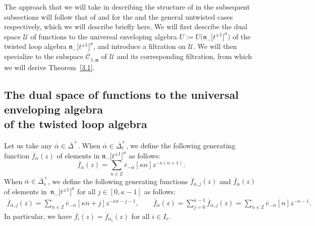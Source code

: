 \documentclass[pdftex]{sigma}
\numberwithin{equation}{section}
\begin{document}
The approach that we will take in describing the structure of  in the subsequent subsections will follow that of \cite{AKS06} and \cite{AK07} for the  and the general untwisted cases respectively, which we will describe briefly here. We will first describe the dual space $\mathcal{U}$ of functions to the universal enveloping algebra $U:=U\bigl(\mathfrak{n}_-\bigl[t^{\pm1}\bigr]^{\sigma}\bigr)$ of the twisted loop algebra $\mathfrak{n}_-\bigl[t^{\pm1}\bigr]^{\sigma}$, and introduce a filtration on $\mathcal{U}$. We will then specialize to the
subspace $\overline{\mathcal{C}}_{\overline{\lambda}, \mathbf{n}}$ of $\mathcal{U}$ and its corresponding filtration, from which we will derive Theorem~\ref{3.1}.

\subsection[The dual space of functions to the universal enveloping algebra of the twisted loop algebra]{The dual space of functions to the universal enveloping algebra\\ of the twisted loop algebra}\label{Section 3.2}

Let us take any $\overline{\alpha}\in\overline{\Delta}^+$. When $\overline{\alpha}\in\overline{\Delta}_{\ell}^+$, we define the following generating function $\overline{f}_{\overline{\alpha}}(z)$ of elements in $\mathfrak{n}_-\bigl[t^{\pm1}\bigr]^{\sigma}$ as follows:
\begin{equation*}
\overline{f}_{\overline{\alpha}}(z)=
\sum_{n\in\mathbb{Z}}\overline{e}_{-\overline{\alpha}}[\kappa n]z^{-\kappa(n+1)}.
\end{equation*}
When $\overline{\alpha}\in\overline{\Delta}_s^+$, we define the following generating functions $\overline{f}_{\overline{\alpha},j}(z)$ and $\overline{f}_{\overline{\alpha}}(z)$ of elements in~$\mathfrak{n}_-\bigl[t^{\pm1}\bigr]^{\sigma}$ for all $j\in[0,\kappa-1]$ as follows:{\samepage
\begin{align*}
\overline{f}_{\overline{\alpha},j}(z)
=\sum_{n\in\mathbb{Z}}\overline{e}_{-\overline{\alpha}}[\kappa n+j]z^{-\kappa n-j-1},\qquad
\overline{f}_{\overline{\alpha}}(z)
=\sum_{j=0}^{\kappa-1}\overline{f}_{\overline{\alpha},j}(z)=\sum_{n\in\mathbb{Z}}\overline{e}_{-\overline{\alpha}}[n]z^{-n-1}.
\end{align*}
In particular, we have $\overline{f}_i(z)= \overline{f}_{\overline{\alpha}_i}(z)$ for all $i\in I_r$.}
\end{document}
